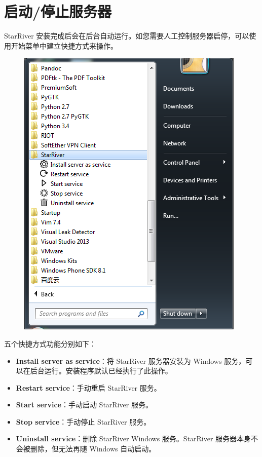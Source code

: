 \section{启动/停止服务器}\label{ux542fux52a8ux505cux6b62ux670dux52a1ux5668}

StarRiver
安装完成后会在后台自动运行。如您需要人工控制服务器启停，可以使用开始菜单中建立快捷方式来操作。

\begin{figure}[htbp]
\centering
\includegraphics{img/shortcuts.png}
\end{figure}

五个快捷方式功能分别如下：

\begin{itemize}
\itemsep1pt\parskip0pt
\item
  \textbf{Install server as service}：将 StarRiver 服务器安装为 Windows
  服务，可以在后台运行。安装程序默认已经执行了此操作。
\item
  \textbf{Restart service}：手动重启 StarRiver 服务。
\item
  \textbf{Start service}：手动启动 StarRiver 服务。
\item
  \textbf{Stop service}：手动停止 StarRiver 服务。
\item
  \textbf{Uninstall service}：删除 StarRiver Windows 服务。StarRiver
  服务器本身不会被删除，但无法再随 Windows 自动启动。
\end{itemize}
